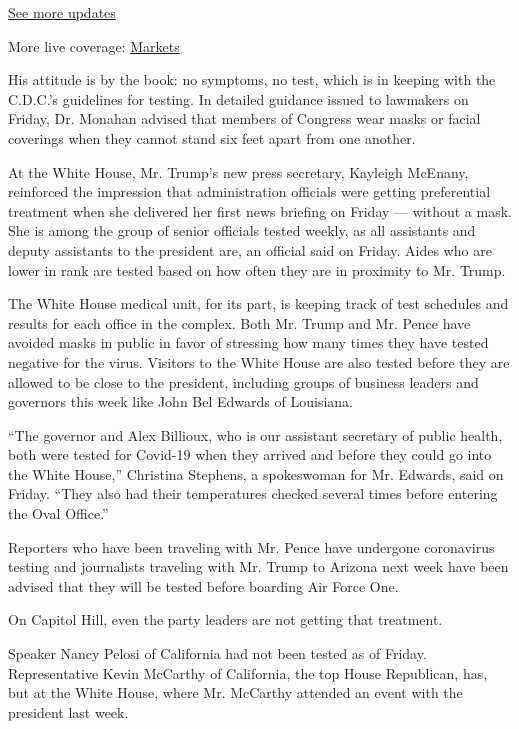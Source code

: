 \href{https://www.nytimes.com/2020/08/01/world/coronavirus-covid-19.html?action=click\&pgtype=Article\&state=default\&region=MAIN_CONTENT_1\&context=storylines_live_updates}{See
more updates}

More live coverage:
\href{https://www.nytimes.com/live/2020/07/31/business/stock-market-today-coronavirus?action=click\&pgtype=Article\&state=default\&region=MAIN_CONTENT_1\&context=storylines_live_updates}{Markets}

His attitude is by the book: no symptoms, no test, which is in keeping
with the C.D.C.'s guidelines for testing. In detailed guidance issued to
lawmakers on Friday, Dr. Monahan advised that members of Congress wear
masks or facial coverings when they cannot stand six feet apart from one
another.

At the White House, Mr. Trump's new press secretary, Kayleigh McEnany,
reinforced the impression that administration officials were getting
preferential treatment when she delivered her first news briefing on
Friday --- without a mask. She is among the group of senior officials
tested weekly, as all assistants and deputy assistants to the president
are, an official said on Friday. Aides who are lower in rank are tested
based on how often they are in proximity to Mr. Trump.

The White House medical unit, for its part, is keeping track of test
schedules and results for each office in the complex. Both Mr. Trump and
Mr. Pence have avoided masks in public in favor of stressing how many
times they have tested negative for the virus. Visitors to the White
House are also tested before they are allowed to be close to the
president, including groups of business leaders and governors this week
like John Bel Edwards of Louisiana.

``The governor and Alex Billioux, who is our assistant secretary of
public health, both were tested for Covid-19 when they arrived and
before they could go into the White House,'' Christina Stephens, a
spokeswoman for Mr. Edwards, said on Friday. ``They also had their
temperatures checked several times before entering the Oval Office.''

Reporters who have been traveling with Mr. Pence have undergone
coronavirus testing and journalists traveling with Mr. Trump to Arizona
next week have been advised that they will be tested before boarding Air
Force One.

On Capitol Hill, even the party leaders are not getting that treatment.

Speaker Nancy Pelosi of California had not been tested as of Friday.
Representative Kevin McCarthy of California, the top House Republican,
has, but at the White House, where Mr. McCarthy attended an event with
the president last week.

